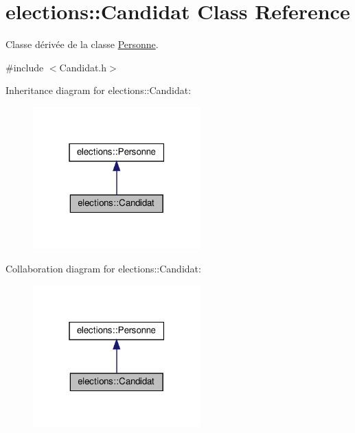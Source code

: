 \hypertarget{classelections_1_1Candidat}{}\section{elections\+:\+:Candidat Class Reference}
\label{classelections_1_1Candidat}


Classe dérivée de la classe \hyperlink{classelections_1_1Personne}{Personne}.  




{\ttfamily \#include $<$Candidat.\+h$>$}



Inheritance diagram for elections\+:\+:Candidat\+:\nopagebreak
\begin{figure}[H]
\begin{center}
\leavevmode
\includegraphics[width=183pt]{classelections_1_1Candidat__inherit__graph}
\end{center}
\end{figure}


Collaboration diagram for elections\+:\+:Candidat\+:\nopagebreak
\begin{figure}[H]
\begin{center}
\leavevmode
\includegraphics[width=183pt]{classelections_1_1Candidat__coll__graph}
\end{center}
\end{figure}
